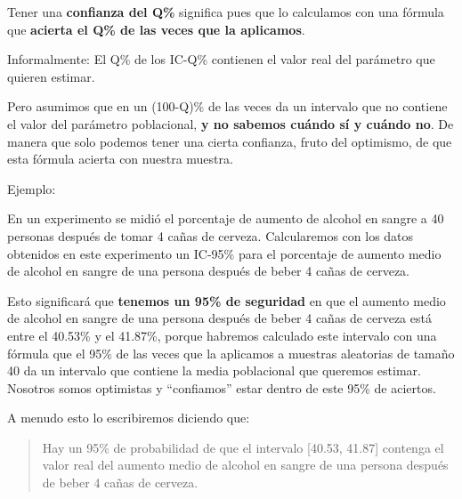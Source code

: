 \documentclass[
  spanish,
  letterpaper,
  DIV=11,
  numbers=noendperiod]{scrreprt}
\begin{document}
Tener una \textbf{confianza del Q\%} significa pues que lo calculamos
con una fórmula que \textbf{acierta el Q\% de las veces que la
aplicamos}.

\begin{tcolorbox}[enhanced jigsaw, arc=.35mm, bottomrule=.15mm, bottomtitle=1mm, breakable, colback=white, colbacktitle=quarto-callout-note-color!10!white, colframe=quarto-callout-note-color-frame, coltitle=black, left=2mm, leftrule=.75mm, opacityback=0, opacitybacktitle=0.6, rightrule=.15mm, title=\textcolor{quarto-callout-note-color}{\faInfo}\hspace{0.5em}{Nota}, titlerule=0mm, toprule=.15mm, toptitle=1mm]

Informalmente: El Q\% de los IC-Q\% contienen el valor real del
parámetro que quieren estimar.

\end{tcolorbox}

Pero asumimos que en un (100-Q)\% de las veces da un intervalo que no
contiene el valor del parámetro poblacional, \textbf{y no sabemos cuándo
sí y cuándo no}. De manera que solo podemos tener una cierta confianza,
fruto del optimismo, de que esta fórmula acierta con nuestra muestra.

Ejemplo:

En un experimento se midió el porcentaje de aumento de alcohol en sangre
a 40 personas después de tomar 4 cañas de cerveza. Calcularemos con los
datos obtenidos en este experimento un IC-95\% para el porcentaje de
aumento medio de alcohol en sangre de una persona después de beber 4
cañas de cerveza.

Esto significará que \textbf{tenemos un 95\% de seguridad} en que el
aumento medio de alcohol en sangre de una persona después de beber 4
cañas de cerveza está entre el 40.53\% y el 41.87\%, porque habremos
calculado este intervalo con una fórmula que el 95\% de las veces que la
aplicamos a muestras aleatorias de tamaño 40 da un intervalo que
contiene la media poblacional que queremos estimar. Nosotros somos
optimistas y ``confiamos'' estar dentro de este 95\% de aciertos.

A menudo esto lo escribiremos diciendo que:

\begin{quote}
Hay un 95\% de probabilidad de que el intervalo {[}40.53, 41.87{]}
contenga el valor real del aumento medio de alcohol en sangre de una
persona después de beber 4 cañas de cerveza.
\end{quote}
\end{document}
